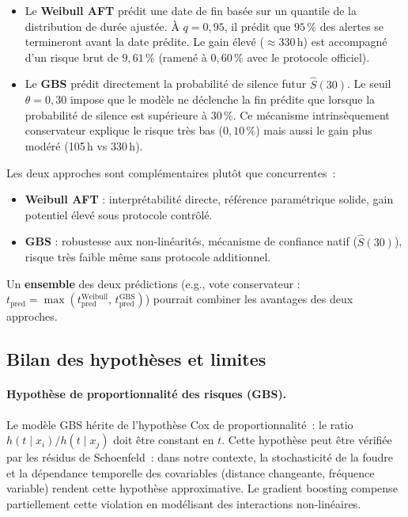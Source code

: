 \documentclass[a4paper,11pt]{article}
\newcommand{\tpred}{t_{\mathrm{pred}}}
\begin{document}
\begin{itemize}[leftmargin=1.8em]
  \item Le \textbf{Weibull AFT} prédit une date de fin basée sur un quantile de la distribution
    de durée ajustée. À $q = 0{,}95$, il prédit que $95\,\%$ des alertes se termineront avant
    la date prédite. Le gain élevé ($\approx 330$\,h) est accompagné d'un risque brut de
    $9{,}61\,\%$ (ramené à $0{,}60\,\%$ avec le protocole officiel).

  \item Le \textbf{GBS} prédit directement la probabilité de silence futur $\hat{S}(30)$.
    Le seuil $\theta = 0{,}30$ impose que le modèle ne déclenche la fin prédite que lorsque
    la probabilité de silence est supérieure à $30\,\%$. Ce mécanisme intrinsèquement
    conservateur explique le risque très bas ($0{,}10\,\%$) mais aussi le gain plus modéré
    (105\,h vs 330\,h).
\end{itemize}

\begin{tcolorbox}[keystyle, title={Complémentarité des deux approches}]
Les deux approches sont complémentaires plutôt que concurrentes~:
\begin{itemize}[leftmargin=1.2em]
  \item \textbf{Weibull AFT} : interprétabilité directe, référence paramétrique solide,
    gain potentiel élevé sous protocole contrôlé.
  \item \textbf{GBS} : robustesse aux non-linéarités, mécanisme de confiance natif
    ($\hat{S}(30)$), risque très faible même sans protocole additionnel.
\end{itemize}
Un \textbf{ensemble} des deux prédictions (e.g., vote conservateur : $\tpred = \max(\tpred^{\text{Weibull}},\, \tpred^{\text{GBS}})$)
pourrait combiner les avantages des deux approches.
\end{tcolorbox}

\subsection{Bilan des hypothèses et limites}

\paragraph{Hypothèse de proportionnalité des risques (GBS).} Le modèle GBS hérite de l'hypothèse
Cox de proportionnalité~: le ratio $h(t \mid x_i) / h(t \mid x_j)$ doit être constant en $t$.
Cette hypothèse peut être vérifiée par les résidus de Schoenfeld~: dans notre contexte, la
stochasticité de la foudre et la dépendance temporelle des covariables (distance changeante,
fréquence variable) rendent cette hypothèse approximative. Le gradient boosting compense
partiellement cette violation en modélisant des interactions non-linéaires.
\end{document}
